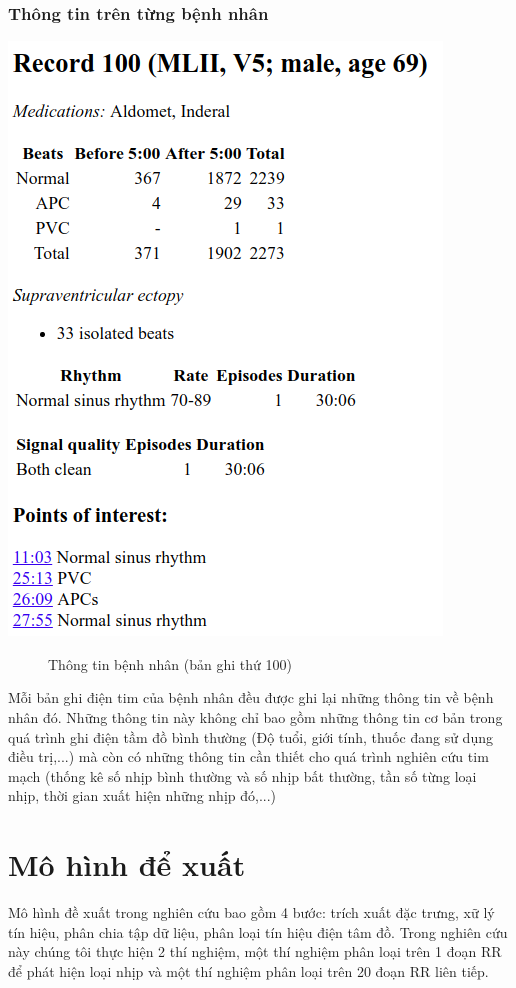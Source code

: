 \subsubsection{Thông tin trên từng bệnh nhân}
\begin{center}
    \includegraphics[scale=.6]{image/chapter2/record_info2.png}
    \begin{figure}[htp]
    \begin{center}
    \end{center}
    \caption{Thông tin bệnh nhân (bản ghi thứ 100)}
    \end{figure}
\end{center}
Mỗi bản ghi điện tim của bệnh nhân đều được ghi lại những thông tin về bệnh nhân đó. Những thông tin này không chỉ bao gồm những thông tin cơ bản trong quá trình ghi điện tầm đồ bình thường (Độ tuổi, giới tính, thuốc đang sử dụng điều trị,...) mà còn có những thông tin cần thiết cho quá trình nghiên cứu tim mạch (thống kê số nhịp bình thường và số nhịp bất thường, tần số từng loại nhịp, thời gian xuất hiện những nhịp đó,...)


\section{Mô hình để xuất}
Mô hình đề xuất trong nghiên cứu bao gồm 4 bước: trích xuất đặc trưng, xữ lý tín hiệu, phân chia tập dữ liệu, phân loại tín hiệu điện tâm đồ. Trong nghiên cứu này chúng tôi thực hiện 2 thí nghiệm, một thí nghiệm phân loại trên 1 đoạn RR để phát hiện loại nhịp và một thí nghiệm phân loại trên 20 đoạn RR liên tiếp.

